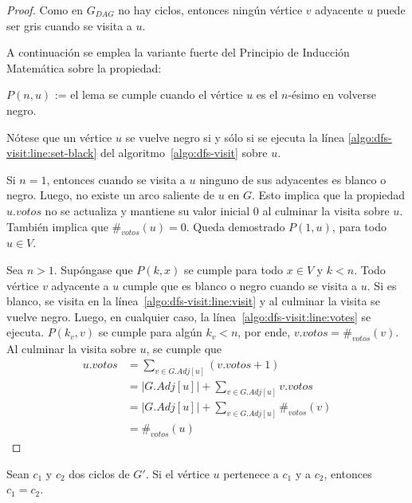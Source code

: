 \begin{proof}
    Como en $G_{DAG}$ no hay ciclos, entonces ning\'un v\'ertice $v$ adyacente $u$ puede ser gris cuando se visita a $u$.

    A continuaci\'on se emplea la variante fuerte del Principio de Inducci\'on Matem\'atica sobre la propiedad:
    \begin{center}
        $P(n, u)$ := el lema se cumple cuando el v\'ertice $u$ es el $n$-\'esimo en volverse negro.
    \end{center}

    N\'otese que un v\'ertice $u$ se vuelve negro si y s\'olo si se ejecuta la l\'inea \ref{algo:dfs-visit:line:set-black} del algoritmo~\ref{algo:dfs-visit} sobre $u$.

    Si $n=1$, entonces cuando se visita a $u$ ninguno de sus adyacentes es blanco o negro. Luego, no existe un arco saliente de $u$ en $G$. Esto implica que la propiedad $u.votos$ no se actualiza y mantiene su valor inicial $0$ al culminar la visita sobre $u$. Tambi\'en implica que $\#_{votos}(u) = 0$. Queda demostrado $P(1, u)$, para todo $u \in V$.

    Sea $n>1$. Sup\'ongase que $P(k, x)$ se cumple para todo $x \in V$ y $k < n$. Todo v\'ertice $v$ adyacente a $u$ cumple que es blanco o negro cuando se visita a $u$. Si es blanco, se visita en la l\'inea~\ref{algo:dfs-visit:line:visit} y al culminar la visita se vuelve negro. Luego, en cualquier caso, la l\'inea~\ref{algo:dfs-visit:line:votes} se ejecuta. $P(k_v, v)$ se cumple para alg\'un $k_v < n$, por ende, $v.votos = \#_{votos}(v)$. Al culminar la visita sobre $u$, se cumple que
    \begin{align*}
        u.votos &= \sum_{v \in G.Adj[u]} (v.votos + 1) \\
        &= |G.Adj[u]| + \sum_{v \in G.Adj[u]} v.votos \\
        &= |G.Adj[u]| + \sum_{v \in G.Adj[u]} \#_{votos}(v) \\
        &= \#_{votos}(u)
    \end{align*}
\end{proof}

\begin{lemma}\label{lemma:one-cycle-only}
    Sean $c_1$ y $c_2$ dos ciclos de $G'$. Si el v\'ertice $u$ pertenece a $c_1$ y  a $c_2$, entonces $c_1 = c_2$.
\end{lemma}

